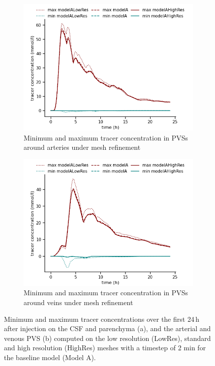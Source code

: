 \documentclass[fleqn,10pt]{wlscirep}
\begin{document}
\begin{figure}
\begin{subfigure}[b]{0.45\textwidth}
        \centering
        \includegraphics[width = 1 \linewidth]{figures/art_minmax.png}
        \caption{Minimum and maximum tracer concentration in PVSs around arteries under mesh refinement}
    \end{subfigure}
    \begin{subfigure}[b]{0.45\textwidth}
        \centering
     \includegraphics[width= 1 \linewidth]{figures/ven_minmax.png}
         \caption{Minimum and maximum tracer concentration in PVSs around veins under mesh refinement}
    \end{subfigure}
    \caption{Minimum and maximum tracer concentrations over the first 24\,h after injection on the CSF and parenchyma (a), and the arterial and venous PVS (b) computed on the low resolution (LowRes), standard and high resolution (HighRes) meshes with a timestep of 2 min for the baseline model (Model A).}
    \label{fig:mesh_convergence_concentrations}
\end{figure}
\end{document}

